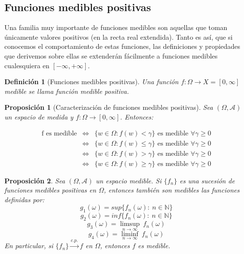 \documentclass[11pt, a4paper]{article}
\newif\IfInSansMode
\newcommand{\fn}{\{f_n\}}
\theoremstyle{theorem-style}
\newtheorem{nprop}{Proposición}[section]
\theoremstyle{definition-style}
\newtheorem{ndef}{Definición}[section]
\theoremstyle{remark-style}
\theoremstyle{example-style}
\begin{document}

\subsection{Funciones medibles positivas}

Una familia muy importante de funciones medibles son aquellas que toman únicamente valores positivos (en la recta real extendida). Tanto es así, que si conocemos el comportamiento de estas funciones, las definiciones y propiedades que derivemos sobre ellas se extenderán fácilmente a funciones medibles cualesquiera en $[-\infty,+\infty]$.

\begin{ndef}[Funciones medibles positivas]
  Una función $f: \Omega \to X = [0,\infty ]$ medible se llama función medible positiva.
\end{ndef}


\begin{nprop}[Caracterización de funciones medibles positivas] \label{criterio_medibles} Sea $(\Omega,\mathscr A)$ un espacio de medida y $f:\Omega \to [0,\infty]$. Entonces: 
  
  \[
  \begin{array}{lll}
    \text{f es medible} & \iff & \{w \in \Omega : f(w) < \gamma \} \text{ es medible } \forall \gamma \geq 0\\

    & \iff & \{w \in \Omega : f(w) \leq \gamma \} \text{ es medible } \forall \gamma \geq 0\\

    & \iff & \{w \in \Omega : f(w) > \gamma \} \text{ es medible } \forall \gamma \geq 0\\

    & \iff & \{w \in \Omega : f(w) \geq \gamma \} \text{ es medible } \forall \gamma \geq 0
    \end{array}
  \]
\end{nprop}

\begin{nprop} \label {p1}
  Sea $(\Omega,\mathscr A)$ un espacio medible. Si $\{f_n\}$ es una sucesión de funciones medibles positivas en $\Omega$, entonces también son medibles las funciones definidas por:
  \[
    g_1(\omega) =  sup\{f_n(\omega) : \ n \in \mathbb{N} \}
  \]
  \[
    g_2(\omega) =  inf\{f_n(\omega) : \ n \in \mathbb{N} \}
  \]
  \[
    g_3(\omega) = \limsup_{n\to \infty} \ f_n(\omega)
  \]
  \[
    g_4(\omega) = \liminf_{n\to \infty}  \ f_n(\omega)
  \]
  En particular, si $\fn \xrightarrow{c.p.} f$ en $\Omega$, entonces $f$ es medible.
\end{nprop}
\end{document}
